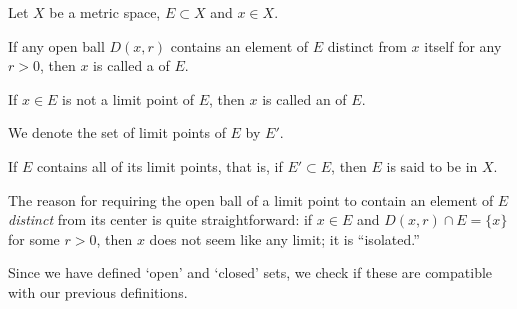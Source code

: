 \begin{definition}[continues=def:mopen]
    \label{def:mclosed}
    Let \(X\) be a metric space,
    \(E\subset X\) and \(x\in X\).
    \begin{nlist}
        \setcounter{nlisti}{5}
        \item If any open ball \(D(x,r)\) contains an element of \(E\)
        distinct from \(x\) itself for any \(r>0\),
        then \(x\) is called
        a  of \(E\).
        
        \item If \(x\in E\) is not a limit point of \(E\),
        then \(x\) is called
        an  of \(E\).

        \item We denote the set of limit points of \(E\) by \(E'\).
        
        \item If \(E\) contains all of its limit points,
        that is, if \(E'\subset E\),
        then \(E\) is said to be  in \(X\).
    \end{nlist}
\end{definition}

The reason for requiring the open ball of a limit point
to contain an element of \(E\) \emph{distinct} from its center
is quite straightforward:
if \(x\in E\) and \(D(x,r)\cap E=\{x\}\) for some \(r>0\),
then \(x\) does not seem like any limit;
it is ``isolated.''

Since we have defined `open' and `closed' sets,
we check if these are compatible with our previous definitions.

